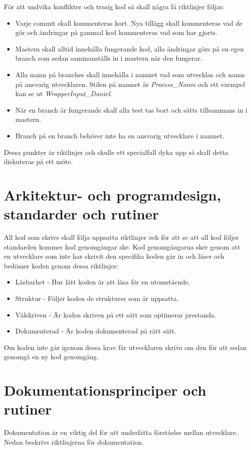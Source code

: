 \documentclass[a4paper,12pt,oneside,final]{extbook}
\begin{document}
För att undvika konflikter och trasig kod så skall några få riktlinjer följas:
\begin{itemize}
	\item Varje commit skall kommenteras kort. Nya tillägg skall kommenteras vad de gör och ändringar på gammal kod kommenteras vad som har gjorts. 
	\item Mastern skall alltid innehålla fungerande kod, alla ändringar görs på en egen branch som sedan sammanställs in i mastern när den fungerar.
	\item Alla namn på branches skall innehålla i namnet vad som utvecklas och namn på ansvarig utvecklaren. Stilen på namnet är \textit{Process\_Namn} och ett exempel kan se ut \textit{WrapperInput\_Daniel}.
	\item När en branch är fungerande skall alla test tas bort och sätts tillsammans in i mastern.
	\item Branch på en branch behöver inte ha en ansvarig utvecklare i namnet. 
\end{itemize}

Dessa punkter är riktlinjer och skulle ett specialfall dyka upp så skall detta diskuteras på ett möte.


\section{Arkitektur- och programdesign, standarder och rutiner}
All kod som skrivs skall följa uppsatta riktlinjer och för att se att all kod följer standarden kommer kod genomgångar ske. Kod genomgångarna sker genom att en utvecklare som inte har skrivit den specifika koden går in och läser och bedömer koden genom dessa riktlinjer:
  \begin{itemize}
  	\item Läsbarhet - Hur lätt koden är att läsa för en utomstående.
  	\item Struktur - Följer koden de strukturer som är uppsatta.
  	\item Välskriven - Är koden skriven på ett sätt som optimerar prestanda.
  	\item Dokumenterad - Är koden dokumenterad på rätt sätt.
  \end{itemize}
Om koden inte går igenom dessa krav får utvecklaren skriva om den för att sedan genomgå en ny kod genomgång.
\section{Dokumentationsprinciper och rutiner}
Dokumentation är en viktig del för att underlätta förståelse mellan utvecklare. Nedan beskrivs riktlinjerna för dokumentation.
\end{document}
